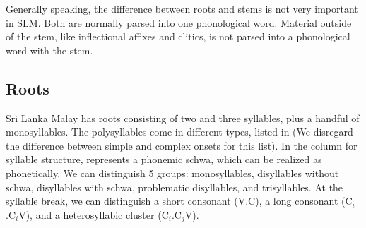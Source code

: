 Generally speaking, the difference between roots and stems is not very important in SLM. Both are normally parsed into one phonological word. Material outside of the stem, like inflectional affixes and clitics, is not parsed into a phonological word with the stem.

\subsection{Roots}\label{sec:phon:struct:Roots}
Sri Lanka Malay has roots consisting of two and three syllables, plus a handful of monosyllables. The polysyllables come in  different types, listed in  (We disregard the difference between simple and complex onsets for this list). In the column for syllable structure, \E{} represents a phonemic schwa, which can be realized as  phonetically. We can distinguish 5 groups: monosyllables, disyllables without schwa, disyllables with schwa, problematic disyllables, and trisyllables. At the syllable break, we can distinguish a short consonant (V.C), a long consonant (C$_i$.C$_i$V), and a heterosyllabic cluster (C$_i$.C$_j$V).


\setcounter{mycounter}{1}

